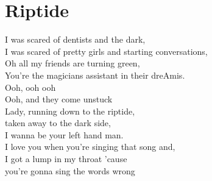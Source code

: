 \section{Riptide}
\onehalfspacing


I was scared of dentists and the dark,\\
I was scared of pretty girls and starting conversations,\\
Oh all my friends are turning green,\\
You're the magicians assistant in their dreAmis.\\

Ooh, ooh ooh\\
Ooh, and they come unstuck\\

{}Lady, running down to the riptide,\\
taken away to the dark side,\\
I wanna be your left hand man.\\
I love you when you're singing that song and,\\
I got a lump in my throat 'cause\\
you're gonna sing the words wrong\\

